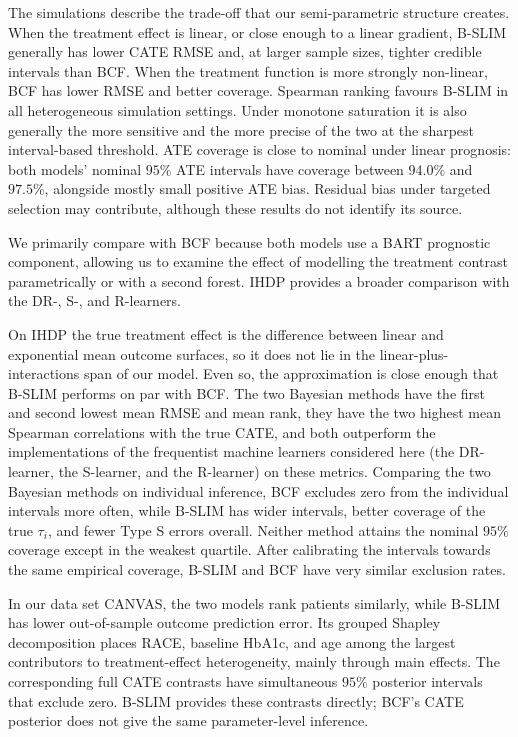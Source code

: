 \documentclass[12pt]{article}
\newcommand{\rev}[1]{\ifdefined\ReviewChanges{\color{revisiongreen}#1}\else#1\fi}
\begin{document}
The simulations describe the trade-off that \rev{our semi-parametric} structure creates. When the treatment effect is linear, or close enough to a linear gradient, B-SLIM generally has lower CATE RMSE and, at larger sample sizes, tighter credible intervals than BCF. When the treatment function is more strongly non-linear, BCF has lower RMSE and better coverage. Spearman ranking favours B-SLIM in all heterogeneous simulation settings. Under monotone saturation it is also generally the more sensitive and the more precise of the two at the sharpest interval-based threshold. ATE coverage is close to nominal under linear prognosis: both models' nominal $95\%$ ATE intervals have coverage between $94.0\%$ and $97.5\%$, alongside mostly small positive ATE bias. Residual bias under targeted selection may contribute, although these results do not identify its source.

We primarily compare with BCF because both models use a BART prognostic component, allowing us to examine the effect of modelling the treatment contrast parametrically or with a second forest. IHDP provides a broader comparison with the DR-, S-, and R-learners.

On IHDP the true treatment effect is the difference between linear and exponential mean outcome surfaces, so it does not lie in the linear-plus-interactions span of our model. Even so, the approximation is close enough that B-SLIM performs on par with BCF. The two Bayesian methods have the first and second lowest mean RMSE and mean rank, they have the two highest mean Spearman correlations with the true CATE, and both outperform the implementations of the frequentist machine learners considered here (the DR-learner, the S-learner, and the R-learner) on these metrics. Comparing the two Bayesian methods on individual inference, BCF excludes zero from the individual intervals more often, while B-SLIM has wider intervals, better coverage of the true $\tau_i$, and fewer Type S errors overall. Neither method attains the nominal $95\%$ coverage except in the weakest quartile. After calibrating the intervals towards the same empirical coverage, B-SLIM and BCF have very similar exclusion rates.

In \rev{our data set CANVAS}, the two models rank patients similarly, while B-SLIM has lower out-of-sample outcome prediction error. Its grouped Shapley decomposition places RACE, baseline HbA1c, and age among the largest contributors to treatment-effect heterogeneity, mainly through main effects. The corresponding full CATE contrasts have simultaneous $95\%$ posterior intervals that exclude zero. B-SLIM provides these contrasts directly; BCF's CATE posterior does not give the same parameter-level inference.
\end{document}
